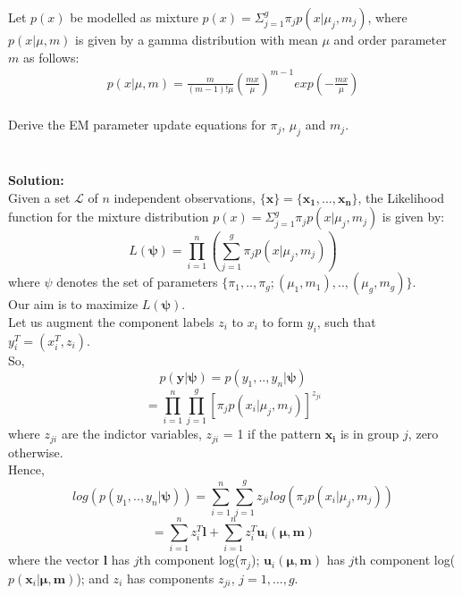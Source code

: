 \documentclass[12pt]{article}
\numberwithin{equation}{section}
\numberwithin{figure}{section}
\numberwithin{table}{section}
\renewcommand{\vec}[1]{\mathbf{#1}}
\begin{document}
Let $p(x)$ be modelled as mixture $p(x) = \varSigma_{j=1}^{g}\pi_{j}p(x|\mu_{j},m_{j})$, where $p(x|\mu,m)$ is given by a gamma distribution with mean $\mu$ and order parameter $m$ as follows:\\
\begin{align}
p(x|\mu,m) = \frac{m}{(m-1)!\mu}(\frac{mx}{\mu})^{m-1}exp(-\frac{mx}{\mu})
\end{align}\\
Derive the EM parameter update equations for $\pi_{j}$, $\mu_{j}$ and $m_{j}$.\\\\\\
\bigskip
{\bf Solution:}
\\
Given a set $\mathcal{L}$ of $n$ independent observations, $\{\vec{x}\} = \{\vec{x_{1}},...,\vec{x_{n}}\}$, the Likelihood function for the mixture distribution $p(x) = \varSigma_{j=1}^{g}\pi_{j}p(x|\mu_{j},m_{j})$ is given by:
\begin{equation*}
L(\vec{\psi}) = \prod\limits_{i=1}^{n}\left(\sum\limits_{j=1}^{g}\pi_{j}p(x|\mu_{j},m_{j})\right)
\end{equation*}
where $\psi$ denotes the set of parameters $\{\pi_{1},..,\pi_{g};(\mu_{1},m_{1}),..,(\mu_{g},m_{g})\}$.\\
Our aim is to maximize $L(\vec{\psi})$.\\
Let us augment the component labels $z_{i}$ to $x_{i}$ to form $y_{i}$, such that $y_{i}^{T} = (x_{i}^{T}, z_{i})$.\\
So,\\
{\large
\begin{equation*}
p(\vec{y}|\vec{\psi}) = p(y_{1},..,y_{n}|\vec{\psi})
\end{equation*}
\begin{equation*}
 = \prod\limits_{i=1}^{n}\prod\limits_{j=1}^{g}\left[\pi_{j}p(x_i|\mu_j,m_j) \right]^{z_{ji}}
\end{equation*}
}
where $z_{ji}$ are the indictor variables, $z_{ji}$ = 1 if the pattern $\vec{x_i}$ is in group $j$, zero otherwise.\\
Hence,\\
{\large
\begin{equation*}
log(p(y_{1},..,y_{n}|\vec{\psi})) = \sum\limits_{i=1}^n\sum\limits_{j=1}^g z_{ji}log(\pi_{j}p(x_i|\mu_j,m_j))
\end{equation*}
\begin{equation*}
= \sum\limits_{i=1}^n z^{T}_{i}\vec{l} + \sum\limits_{i=1}^n z_{i}^{T}\vec{u}_{i}(\vec{\mu},\vec{m})
\end{equation*}
}
where the vector $\vec{l}$ has $j$th component log($\pi_{j}$); $\vec{u}_{i}(\vec{\vec{\mu},\vec{m}})$ has $j$th component log($p(\vec{x}_{i}|\vec{\mu},\vec{m})$); and $z_i$ has components $z_{ji}$, $j=1,...,g$.
\end{document}
